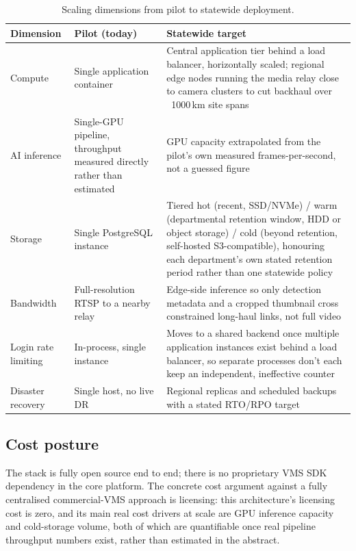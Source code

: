 \documentclass[11pt,a4paper]{article}
\begin{document}
\begin{table}[h]
\centering
\small
\begin{tabular}{L{2.6cm}L{4.6cm}L{5.7cm}}
\toprule
\textbf{Dimension} & \textbf{Pilot (today)} & \textbf{Statewide target} \\
\midrule
Compute & Single application container & Central application tier behind a load balancer, horizontally scaled; regional edge nodes running the media relay close to camera clusters to cut backhaul over ~1000\,km site spans \\
AI inference & Single-GPU pipeline, throughput measured directly rather than estimated & GPU capacity extrapolated from the pilot's own measured frames-per-second, not a guessed figure \\
Storage & Single PostgreSQL instance & Tiered hot (recent, SSD/NVMe) / warm (departmental retention window, HDD or object storage) / cold (beyond retention, self-hosted S3-compatible), honouring each department's own stated retention period rather than one statewide policy \\
Bandwidth & Full-resolution RTSP to a nearby relay & Edge-side inference so only detection metadata and a cropped thumbnail cross constrained long-haul links, not full video \\
Login rate limiting & In-process, single instance & Moves to a shared backend once multiple application instances exist behind a load balancer, so separate processes don't each keep an independent, ineffective counter \\
Disaster recovery & Single host, no live DR & Regional replicas and scheduled backups with a stated RTO/RPO target \\
\bottomrule
\end{tabular}
\caption{Scaling dimensions from pilot to statewide deployment.}
\label{tab:scale-plan}
\end{table}

\subsection{Cost posture}

The stack is fully open source end to end; there is no proprietary VMS SDK
dependency in the core platform. The concrete cost argument against a
fully centralised commercial-VMS approach is licensing: this architecture's
licensing cost is zero, and its main real cost drivers at scale are GPU
inference capacity and cold-storage volume, both of which are quantifiable
once real pipeline throughput numbers exist, rather than estimated in the
abstract.
\end{document}
